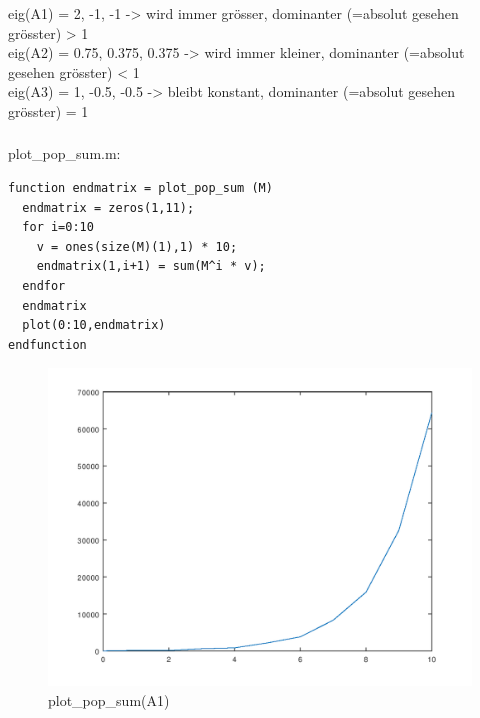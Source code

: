\documentclass{article}
\begin{document}
\subsubsection{}
eig(A1) = 2, -1, -1 -> wird immer grösser, dominanter (=absolut gesehen grösster) > 1 \\
eig(A2) = 0.75, 0.375, 0.375 -> wird immer kleiner, dominanter (=absolut gesehen grösster) < 1 \\
eig(A3) = 1, -0.5, -0.5 -> bleibt konstant, dominanter (=absolut gesehen grösster) = 1 \\
\subsubsection{}
plot\_pop\_sum.m:
\begin{lstlisting}
function endmatrix = plot_pop_sum (M)
  endmatrix = zeros(1,11);
  for i=0:10
    v = ones(size(M)(1),1) * 10;
    endmatrix(1,i+1) = sum(M^i * v);
  endfor
  endmatrix
  plot(0:10,endmatrix)
endfunction
\end{lstlisting}

\begin{figure}[H]
\centering
\includegraphics[scale=0.6]{plotA1.png}
\caption{plot\_pop\_sum(A1)}
\label{fig:universe}
\end{figure}
\end{document}
